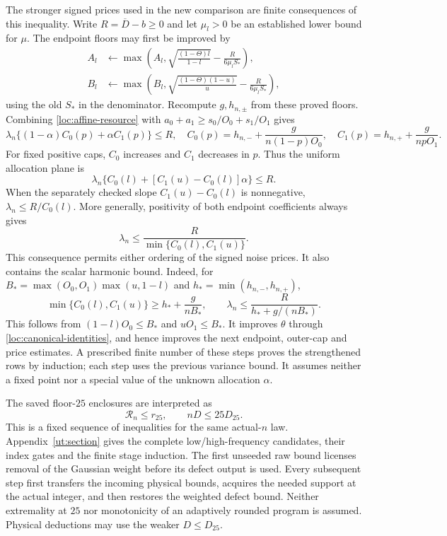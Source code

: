 The stronger signed prices used in the new comparison are finite
consequences of this inequality. Write $R=\overline D-b\ge0$ and
let $\mu_l>0$ be an established lower bound for $\mu$. The endpoint
floors may first be improved by
\begin{align*}
 A_l&\leftarrow\max\left(A_l,
   \sqrt{\frac{(1-\Theta)l}{1-l}}-\frac{R}{6\mu_lS_*}\right),\\
 B_l&\leftarrow\max\left(B_l,
   \sqrt{\frac{(1-\Theta)(1-u)}u}-\frac{R}{6\mu_lS_*}\right),
\end{align*}
using the old $S_*$ in the denominator. Recompute $g,h_{n,\pm}$ from
these proved floors. Combining \eqref{loc:affine-resource} with
$a_0+a_1\ge s_0/O_0+s_1/O_1$ gives
\[
 \lambda_n\{(1-\alpha)C_0(p)+\alpha C_1(p)\}\le R,
 \quad C_0(p)=h_{n,-}+\frac{g}{n(1-p)O_0},\quad
 C_1(p)=h_{n,+}+\frac{g}{npO_1}.
\]
For fixed positive caps, $C_0$ increases and $C_1$ decreases in $p$.
Thus the uniform allocation plane is
\begin{equation}\label{loc:uniform-allocation}
 \lambda_n\{C_0(l)+[C_1(u)-C_0(l)]\alpha\}\le R.
\end{equation}
When the separately checked slope $C_1(u)-C_0(l)$ is nonnegative,
$\lambda_n\le R/C_0(l)$. More generally, positivity of both
endpoint coefficients always gives
\begin{equation}\label{loc:two-endpoint-noise}
 \lambda_n\le\frac{R}{\min\{C_0(l),C_1(u)\}}.
\end{equation}
This consequence permits either ordering of the signed noise prices.
It also contains the scalar harmonic bound. Indeed, for
$B_* =\max(O_0,O_1)\max(u,1-l)$ and
$h_* =\min(h_{n,-},h_{n,+})$,
\begin{equation}\label{loc:harmonic-consequence}
 \min\{C_0(l),C_1(u)\}\ge h_*+\frac{g}{nB_*},\qquad
 \lambda_n\le\frac{R}{h_*+g/(nB_*)}.
\end{equation}
This follows from $(1-l)O_0\le B_*$ and $uO_1\le B_*$.
It improves $\theta$ through
\eqref{loc:canonical-identities}, and hence improves the next endpoint,
outer-cap and price estimates. A prescribed finite number of these
steps proves the strengthened rows by induction; each step uses the
previous variance bound. It assumes neither a fixed point nor a
special value of the unknown allocation $\alpha$.

The saved floor-$25$ enclosures are interpreted as
\begin{equation}\label{loc:weighted-transfer}
 \mathcal R_n\le r_{25},\qquad nD\le25D_{25}.
\end{equation}
This is a fixed sequence of inequalities for the same actual-$n$ law.
Appendix~\ref{ut:section} gives the complete low/high-frequency
candidates, their index gates and the finite stage induction.
The first unseeded raw bound licenses removal of the Gaussian weight
before its defect output is used. Every subsequent step first
transfers the incoming physical bounds, acquires the needed support
at the actual integer, and then restores the weighted defect bound.
Neither extremality at $25$ nor monotonicity of an adaptively rounded
program is assumed. Physical deductions may use the weaker $D\le D_{25}$.

